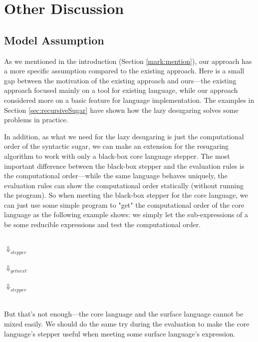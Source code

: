 \section{Other Discussion}
\label{sec5}

\subsection{Model Assumption}
\label{sec5.1}


As we mentioned in the introduction (Section \ref{mark:mention}), our approach has a more specific assumption compared to the existing approach. Here is a small gap between the motivation of the existing approach and ours---the existing approach focused mainly on a tool for existing language, while our approach considered more on a basic feature for language implementation. The examples in Section \ref{sec:recursiveSugar} have shown how the lazy desugaring solves some problems in practice.

In addition, as what we need for the lazy desugaring is just the computational order of the syntactic sugar, we can make an extension for the resugaring algorithm to work with only a black-box core language stepper. The most important difference between the black-box stepper and the evaluation rules is the computational order---while the same language behaves uniquely, the evaluation rules can show the computational order statically (without running the program). So when meeting the black-box stepper for the core language, we can just use some simple program to "get" the computational order of the core language as the following example  shows: we simply let the sub-expressions of a  be some reducible expressions and test the computational order. 

\begin{center}\footnotesize
	\\ $\Downarrow_{stepper}$\\ \\ $\Downarrow_{getnext}$\\ \\ $\Downarrow_{stepper}$\\ \qquad{}\\
\end{center}


But that's not enough---the core language and the surface language cannot be mixed easily. We should do the same try during the evaluation to make the core language's stepper useful when meeting some surface language's expression.

